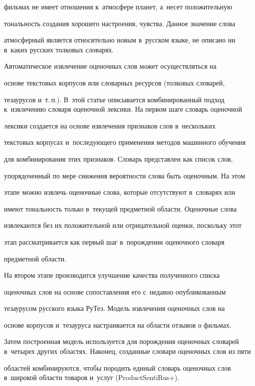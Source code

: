 фильмах не имеет отношения к~атмосфере планет, а~несет положительную


тональность создания хорошего настроения, чувства. Данное значение слова


атмосферный является относительно новым в~русском языке, не описано ни в~каких русских толковых словарях.





     Автоматическое извлечение оценочных слов может осуществляться на


основе текстовых корпусов или словарных ресурсов (толковых словарей,


тезаурусов и~т.\,п.). В~этой статье описывается комбинированный подход к~извлечению словаря оценочной лексики. На первом шаге словарь оценочной


лексики создается на основе извлечения признаков слов в~нескольких


текстовых корпусах и~последующего применения методов машинного обучения


для комбинирования этих признаков. Словарь представлен как список слов,


упорядоченный по мере снижения вероятности слова быть оценочным. На этом


этапе можно извлечь оценочные слова, которые отсутствуют в~словарях или


имеют тональность только в~текущей предметной области. Оценочные слова


извлекаются без их положительной или отрицательной оценки, поскольку этот


этап рассматривается как первый шаг в~порождении оценочного словаря


предметной области.





     На втором этапе производится улучшение качества полученного списка


оценочных слов на основе сопоставления его с~недавно опубликованным


тезаурусом русского языка РуТез. Модель извлечения оценочных слов на


основе корпусов и~тезауруса настраивается на области отзывов о фильмах.


Затем построенная модель используется для порождения оценочных словарей в~четырех других областях. Наконец, созданные словари оценочных слов из пяти


областей комбинируются, чтобы породить единый словарь оценочных слов в~широкой области товаров и~услуг (ProductSentiRus+).





